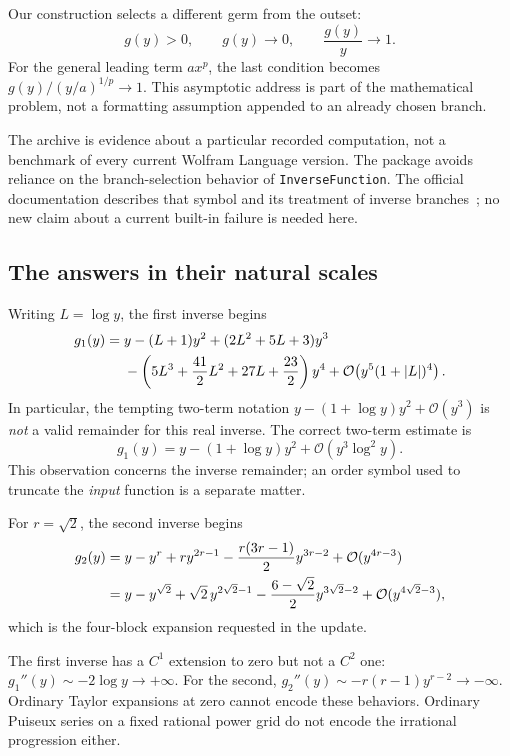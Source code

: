 \documentclass[11pt,a4paper]{article}
\numberwithin{equation}{section}
\theoremstyle{definition}
\theoremstyle{remark}
\newcommand{\OO}{\mathcal O}
\newcommand{\code}[1]{\texttt{#1}}
\begin{document}
Our construction selects a different germ from the outset:
\begin{equation}\label{eq:branch-address}
 g(y)>0,\qquad g(y)\longrightarrow0,\qquad \frac{g(y)}{y}\longrightarrow1.
\end{equation}
For the general leading term $a x^p$, the last condition becomes
$g(y)/(y/a)^{1/p}\to1$. This asymptotic address is part of the mathematical
problem, not a formatting assumption appended to an already chosen branch.

The archive is evidence about a particular recorded computation, not a
benchmark of every current Wolfram Language version. The package avoids
reliance on the branch-selection behavior of \code{InverseFunction}.
The official documentation describes that symbol and its treatment of
inverse branches~\cite{wlinverse}; no new claim about a current built-in
failure is needed here.

\subsection{The answers in their natural scales}

Writing $L=\log y$, the first inverse begins
\begin{align}\label{eq:loganswer}
 g_1(y)={}&y-(L+1)y^2+(2L^2+5L+3)y^3\notag\\
 &-\left(5L^3+\frac{41}{2}L^2+27L+\frac{23}{2}\right)y^4
 +\OO\!\left(y^5(1+|L|)^4\right).
\end{align}
In particular, the tempting two-term notation
$y-(1+\log y)y^2+\OO(y^3)$ is \emph{not} a valid remainder for this real
inverse. The correct two-term estimate is
\begin{equation}\label{eq:twotermerror}
 g_1(y)=y-(1+\log y)y^2+\OO(y^3\log^2 y).
\end{equation}
This observation concerns the inverse remainder; an order symbol used to
truncate the \emph{input} function is a separate matter.

For $r=\sqrt2$, the second inverse begins
\begin{align}\label{eq:irranswer}
 g_2(y)={}&y-y^r+r y^{2r-1}
 -\frac{r(3r-1)}2y^{3r-2}
 +\OO(y^{4r-3})\notag\\
 ={}&y-y^{\sqrt2}+\sqrt2\,y^{2\sqrt2-1}
 -\frac{6-\sqrt2}{2}y^{3\sqrt2-2}
 +\OO(y^{4\sqrt2-3}),
\end{align}
which is the four-block expansion requested in the update.

The first inverse has a $C^1$ extension to zero but not a $C^2$ one:
$g_1''(y)\sim-2\log y\to+\infty$. For the second,
$g_2''(y)\sim-r(r-1)y^{r-2}\to-\infty$. Ordinary Taylor expansions at zero
cannot encode these behaviors. Ordinary Puiseux series on a fixed rational
power grid do not encode the irrational progression either.
\end{document}
